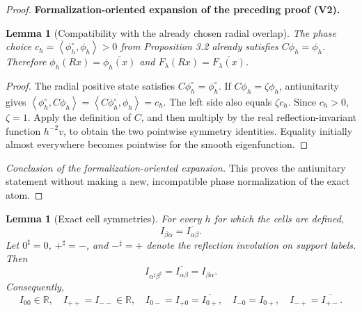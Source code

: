 \documentclass[11pt]{article}
\newtheorem{lemma}[theorem]{Lemma}
\newcommand{\formalisationparentid}{X}
\newenvironment{formalisationaddition}[1]{\par\medskip\begingroup\color{blue}\def\formalisationparentid{#1}\setcounter{formalizationsublemma}{0}\let\lemma\formalizationsublemma\let\endlemma\endformalizationsublemma
  \def\Eo{\mathcal E_h^\circ}\def\EE{\mathcal E_h}\def\phio{\phi_h^\circ}\def\phih{\phi_h}\def\Ho{H_h^{\rm atom}(v^\circ)}\def\Ha{H_h^{\rm atom}}\def\HL{H_h^{L}}\def\Dh{D_h}\def\Log{\operatorname{Log}}\def\ellh{\ell_h}\def\Gp{G_{p,h}}\def\Ast{A_{*,h}}\def\ahat{\widehat{\mathfrak a}_h}\def\ah{\mathfrak a_h}\def\rh{\widehat\rho_h}\def\deltah{\widehat\delta_h}\def\oldref##1{\textup{(##1)}}\def\interface##1{\par\noindent\textit{Analytical interface used here.} ##1\par}\def\finish{\par\noindent\textit{Conclusion of the formalization-oriented expansion.} }\par\noindent\textbf{Formalization-oriented expansion of the preceding proof (V2).}\par\smallskip
}{\par\endgroup\medskip
}
\newcommand{\R}{\mathbb R}
\newcommand{\ip}[2]{\left\langle #1,#2\right\rangle}
\begin{document}
\begin{proof}
\begin{formalisationaddition}{L5.2}
\begin{lemma}[Compatibility with the already chosen radial overlap]\label{sublemma:L5-2-phase-choice}
The phase choice $c_h=\ip{\phio}{\phih}>0$ from Proposition 3.2 already satisfies $C\phih=\phih$. Therefore $\phih(Rx)=\overline{\phih(x)}$ and $F_\lambda(Rx)=\overline{F_\lambda(x)}$.
\end{lemma}
\begin{proof}
The radial positive state satisfies $C\phio=\phio$. If $C\phih=\zeta\phih$, antiunitarity gives
$\ip{\phio}{C\phih}=\overline{\ip{C\phio}{\phih}}=c_h$.
The left side also equals $\zeta c_h$. Since $c_h>0$, $\zeta=1$. Apply the definition of $C$, and then multiply by the real reflection-invariant function $h^{-2}v$, to obtain the two pointwise symmetry identities. Equality initially almost everywhere becomes pointwise for the smooth eigenfunction.
\end{proof}
\finish This proves the antiunitary statement without making a new, incompatible phase normalization of the exact atom.
\end{formalisationaddition}

\end{proof}

\begin{lemma}[Exact cell symmetries]\label{lem:cell-symmetries}
For every $h$ for which the cells are defined,
\begin{equation}\label{eq:swap-symmetry}
 I_{\beta\alpha}=\overline{I_{\alpha\beta}}.
\end{equation}
Let $0^\sharp=0$, $+^\sharp=-$, and $-^\sharp=+$ denote the reflection
involution on support labels.  Then
\begin{equation}\label{eq:reflection-cell-symmetry}
 I_{\alpha^\sharp\beta^\sharp}
 =\overline{I_{\alpha\beta}}
 =I_{\beta\alpha}.
\end{equation}
Consequently,
\begin{equation}\label{eq:cell-symmetry-list}
 I_{00}\in\R,
 \quad I_{++}=I_{--}\in\R,
 \quad I_{0-}=I_{+0}=\overline{I_{0+}},
 \quad I_{-0}=I_{0+},
 \quad I_{-+}=\overline{I_{+-}}.
\end{equation}
\end{lemma}
\end{document}
